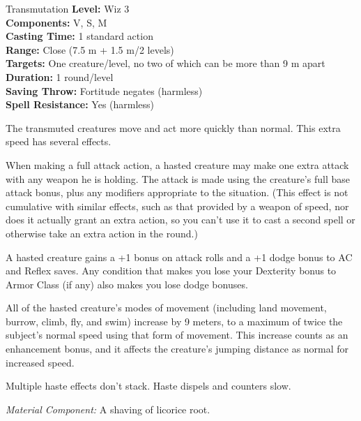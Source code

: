 {Transmutation}
{
	\textbf{Level:}
	Wiz 3\\
	\textbf{Components:}
	V, S, M\\
	\textbf{Casting Time:}
	1 standard action\\
	\textbf{Range:}
	Close (7.5 m + 1.5 m/2 levels)\\
	\textbf{Targets:}
	One creature/level, no two of which can be more than 9 m apart\\
	\textbf{Duration:}
	1 round/level\\
	\textbf{Saving Throw:}
	Fortitude negates (harmless)\\
	\textbf{Spell Resistance:}
	Yes (harmless)\\
}
{
	The transmuted creatures move and act more quickly than normal. This extra speed has several effects.

	When making a full attack action, a hasted creature may make one extra attack with any weapon he is holding. The attack is made using the creature's full base attack bonus, plus any modifiers appropriate to the situation. (This effect is not cumulative with similar effects, such as that provided by a weapon of speed, nor does it actually grant an extra action, so you can't use it to cast a second spell or otherwise take an extra action in the round.)

	A hasted creature gains a +1 bonus on attack rolls and a +1 dodge bonus to AC and Reflex saves. Any condition that makes you lose your Dexterity bonus to Armor Class (if any) also makes you lose dodge bonuses.

	All of the hasted creature's modes of movement (including land movement, burrow, climb, fly, and swim) increase by 9 meters, to a maximum of twice the subject's normal speed using that form of movement. This increase counts as an enhancement bonus, and it affects the creature's jumping distance as normal for increased speed.

	Multiple haste effects don't stack. Haste dispels and counters slow.

	\textit{Material Component:}
	A shaving of licorice root.

}
